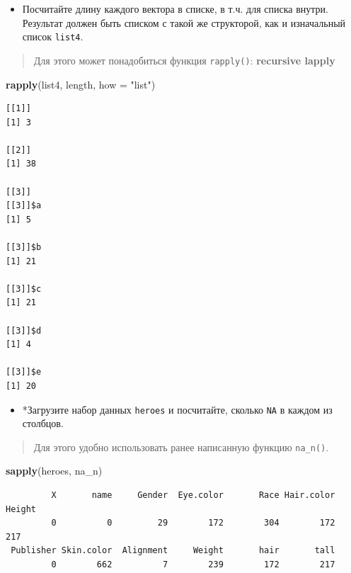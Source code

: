 \documentclass[
]{book}
\newenvironment{Shaded}{\begin{snugshade}}{\end{snugshade}}
\newcommand{\DataTypeTok}[1]{\textcolor[rgb]{0.13,0.29,0.53}{#1}}
\newcommand{\KeywordTok}[1]{\textcolor[rgb]{0.13,0.29,0.53}{\textbf{#1}}}
\newcommand{\NormalTok}[1]{#1}
\newcommand{\StringTok}[1]{\textcolor[rgb]{0.31,0.60,0.02}{#1}}
\providecommand{\tightlist}{%
  \setlength{\itemsep}{0pt}\setlength{\parskip}{0pt}}
\begin{document}
\begin{itemize}
\tightlist
\item
  Посчитайте длину каждого вектора в списке, в т.ч. для списка внутри. Результат должен быть списком с такой же структорой, как и изначальный список \texttt{list4}.
\end{itemize}

\begin{quote}
Для этого может понадобиться функция \texttt{rapply()}: \textbf{recursive lapply}
\end{quote}

\begin{Shaded}
\begin{Highlighting}[]
\KeywordTok{rapply}\NormalTok{(list4, length, }\DataTypeTok{how =} \StringTok{"list"}\NormalTok{)}
\end{Highlighting}
\end{Shaded}

\begin{verbatim}
[[1]]
[1] 3

[[2]]
[1] 38

[[3]]
[[3]]$a
[1] 5

[[3]]$b
[1] 21

[[3]]$c
[1] 21

[[3]]$d
[1] 4

[[3]]$e
[1] 20
\end{verbatim}

\begin{itemize}
\tightlist
\item
  *Загрузите набор данных \texttt{heroes} и посчитайте, сколько \texttt{NA} в каждом из столбцов.
\end{itemize}

\begin{quote}
Для этого удобно использовать ранее написанную функцию \texttt{na\_n()}.
\end{quote}

\begin{Shaded}
\begin{Highlighting}[]
\KeywordTok{sapply}\NormalTok{(heroes, na_n)}
\end{Highlighting}
\end{Shaded}

\begin{verbatim}
         X       name     Gender  Eye.color       Race Hair.color     Height 
         0          0         29        172        304        172        217 
 Publisher Skin.color  Alignment     Weight       hair       tall 
         0        662          7        239        172        217 
\end{verbatim}
\end{document}
